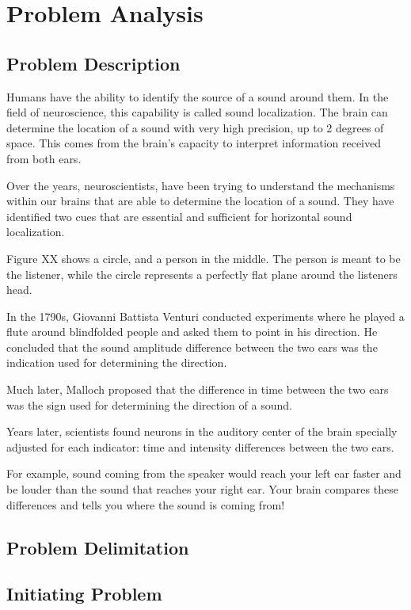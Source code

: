 \chapter{Problem Analysis}\label{ProblemAnalysis}
\section{Problem Description}
Humans have the ability to identify the source of a sound around them. In the 
field of neuroscience, this capability is called sound localization. The brain
can determine the location of a sound with very high precision, up to 2 degrees 
of space. This comes from the brain's capacity to interpret information received
from both ears.


Over the years, neuroscientists, have been trying to understand the mechanisms 
within our brains that are able to determine the location of a sound. They have 
identified two cues that are essential and sufficient for horizontal sound
localization.

Figure XX shows a circle, and a person in the middle. The person is meant to be
the listener, while the circle represents a perfectly flat plane around the listeners
head. 

In the 1790s, Giovanni Battista Venturi conducted experiments where he played a flute around 
blindfolded people and asked them to point in his direction. He concluded that the sound
amplitude difference between the two ears was the indication used for determining the direction.

Much later, Malloch proposed that the difference in time between the two ears was the sign
used for determining the direction of a sound.

Years later, scientists found neurons in the auditory center of the brain
specially adjusted for each indicator: time and intensity differences between the two ears.


For example, sound coming from 
the speaker would reach your left ear faster and be louder than the sound that 
reaches your right ear. Your brain compares these differences and tells you 
where the sound is coming from!


\section{Problem Delimitation}
\section{Initiating Problem}


